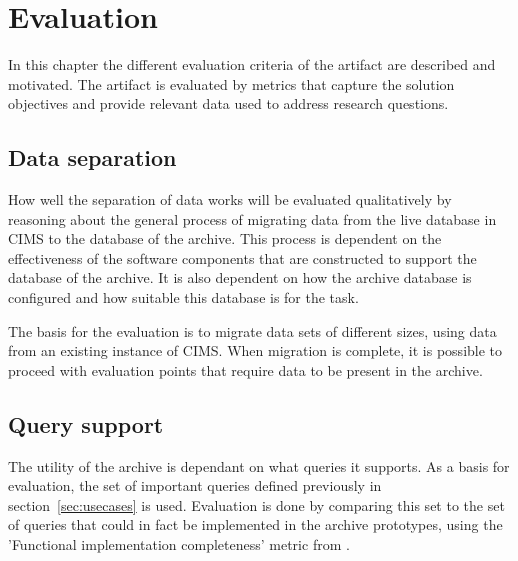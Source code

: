 \chapter{Evaluation}
\label{chap:eval}

In this chapter the different evaluation criteria of the artifact are described and motivated. The artifact is evaluated by metrics that capture the solution objectives and provide relevant data used to address research questions.

 
\section{Data separation}
How well the separation of data works will be evaluated qualitatively by reasoning about the general process of migrating data from the live database in CIMS to the database of the archive. This process is dependent on the effectiveness of the software components that are constructed to support the database of the archive. It is also dependent on how the archive database is configured and how suitable this database is for the task.

The basis for the evaluation is to migrate data sets of different sizes, using data from an existing instance of CIMS. When migration is complete, it is possible to proceed with evaluation points that require data to be present in the archive.  



\section{Query support}
The utility of the archive is dependant on what queries it supports. As a basis for evaluation, the set of important queries defined previously in section~\ref{sec:usecases} is used. Evaluation is done by comparing this set to the set of queries that could in fact be implemented in the archive prototypes, using the 'Functional implementation completeness' metric from \cite{isoExternalMetric}.

